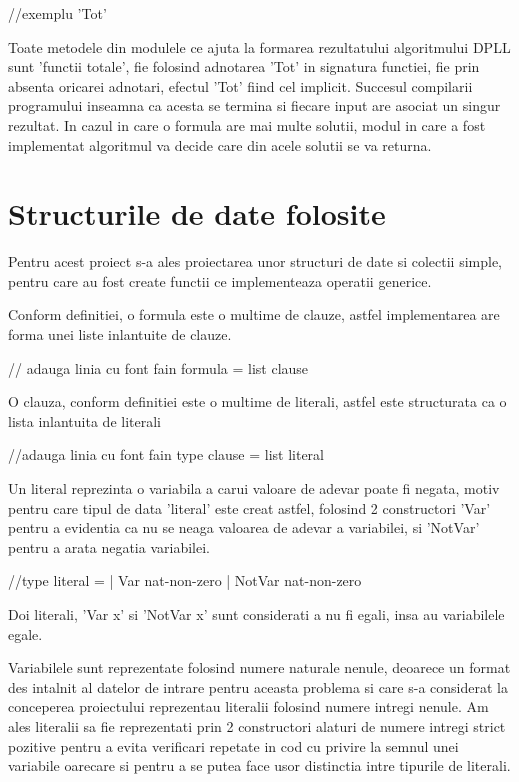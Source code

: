 //exemplu 'Tot'

Toate metodele din modulele ce ajuta la formarea rezultatului algoritmului DPLL sunt 'functii totale', fie folosind adnotarea 'Tot' in signatura functiei, fie prin absenta oricarei adnotari, efectul 'Tot' fiind cel implicit. Succesul compilarii programului inseamna ca acesta se termina si fiecare input are asociat un singur rezultat. In cazul in care o formula are mai multe solutii, modul in care a fost implementat algoritmul va decide care din acele solutii se va returna.


\section{Structurile de date folosite}

Pentru acest proiect s-a ales proiectarea unor structuri de date si colectii simple, pentru care au fost create functii ce implementeaza operatii generice.

Conform definitiei, o formula este o multime de clauze, astfel implementarea are forma unei liste inlantuite de clauze.

// adauga linia cu font fain formula = list clause

O clauza, conform definitiei este o multime de literali, astfel este structurata ca o lista inlantuita de literali

//adauga linia cu font fain type clause = list literal

Un literal reprezinta o variabila a carui valoare de adevar poate fi negata, motiv pentru care tipul de data 'literal' este creat astfel, folosind 2 constructori 'Var' pentru a evidentia ca nu se neaga valoarea de adevar a variabilei, si 'NotVar' pentru a arata negatia variabilei.

//type literal = 
	| Var nat-non-zero
	| NotVar nat-non-zero
	
Doi literali, 'Var x' si 'NotVar x' sunt considerati a nu fi egali, insa au variabilele egale.
	
Variabilele sunt reprezentate folosind numere naturale nenule, deoarece un format des intalnit al datelor de intrare pentru aceasta problema si care s-a considerat la conceperea proiectului reprezentau literalii folosind numere intregi nenule. Am ales literalii sa fie reprezentati prin 2 constructori alaturi de numere intregi strict pozitive pentru a evita verificari repetate in cod cu privire la semnul unei variabile oarecare si pentru a se putea face usor distinctia intre tipurile de literali.


